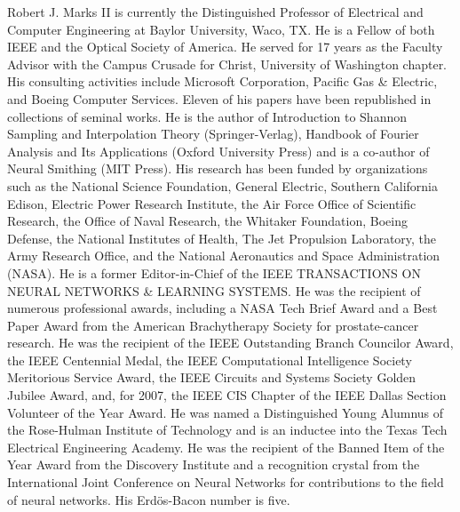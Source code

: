 
Robert J. Marks II is currently the Distinguished Professor of Electrical and Computer Engineering 
at Baylor University, Waco, TX. He is a Fellow of both IEEE and the Optical Society
of America. He served for 17 years as the Faculty Advisor with the Campus Crusade for Christ,
University of Washington chapter. His consulting activities include Microsoft Corporation, Pacific
Gas \& Electric, and Boeing Computer Services. Eleven of his papers have been republished in collections 
of seminal works. He is the author of Introduction to Shannon Sampling and Interpolation
Theory (Springer-Verlag), Handbook of Fourier Analysis and Its Applications (Oxford University
Press) and is a co-author of Neural Smithing (MIT Press). His research has been funded by organizations 
such as the National Science Foundation, General Electric, Southern California Edison,
Electric Power Research Institute, the Air Force Office of Scientific Research, the Office of Naval
Research, the Whitaker Foundation, Boeing Defense, the National Institutes of Health, The Jet
Propulsion Laboratory, the Army Research Office, and the National Aeronautics and Space Administration 
(NASA). He is a former Editor-in-Chief of the IEEE TRANSACTIONS ON NEURAL
NETWORKS \& LEARNING SYSTEMS. He was the recipient of numerous professional awards,
including a NASA Tech Brief Award and a Best Paper Award from the American Brachytherapy
Society for prostate-cancer research. He was the recipient of the IEEE Outstanding Branch Councilor 
Award, the IEEE Centennial Medal, the IEEE Computational Intelligence Society Meritorious
Service Award, the IEEE Circuits and Systems Society Golden Jubilee Award, and, for 2007, the
IEEE CIS Chapter of the IEEE Dallas Section Volunteer of the Year Award. He was named a
Distinguished Young Alumnus of the Rose-Hulman Institute of Technology and is an inductee into
the Texas Tech Electrical Engineering Academy. He was the recipient of the Banned Item of the
Year Award from the Discovery Institute and a recognition crystal from the International Joint
Conference on Neural Networks for contributions to the field of neural networks. His Erd\"{o}s-Bacon
number is five.
